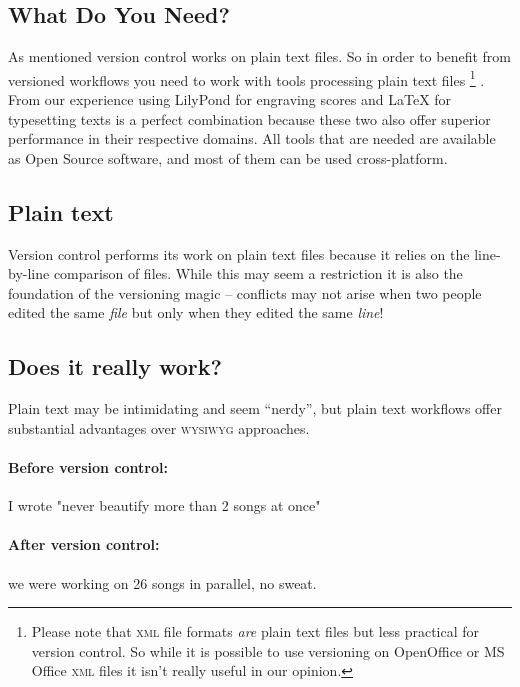 \documentclass[11pt,a4paper]{article}
\begin{document}
\subsection{What Do You Need?}
As mentioned version control works on plain text files. So in order to benefit from versioned
workflows you need to work with tools processing plain text files%
\footnote{Please note that \textsc{xml} file formats \emph{are} plain text files
but less practical for version control. So while it is possible to use versioning on
OpenOffice or MS Office \textsc{xml} files it isn't really useful in our opinion.}
. From our experience
using LilyPond for engraving scores and \LaTeX{} for typesetting texts is a perfect
combination because these two also offer superior performance in their respective domains.
All tools that are needed are available as Open Source software, and most of them can
be used cross-platform.

\subsection{Plain text}
Version control performs its work on plain text files because it relies on the 
line-by-line comparison of files. While this may seem a restriction it is also the
foundation of the versioning magic -- conflicts may not arise when two people edited the
same \emph{file} but only when they edited the same \emph{line}!

\subsection{Does it really work?}
Plain text may be intimidating and seem “nerdy”, 
but plain text workflows offer substantial advantages over \textsc{wysiwyg}
approaches. 

\paragraph{Before version control:}
I wrote "never beautify more than 2 songs at once"

\paragraph{After version control:}
we were working on 26 songs in parallel, no sweat.

\end{document}
